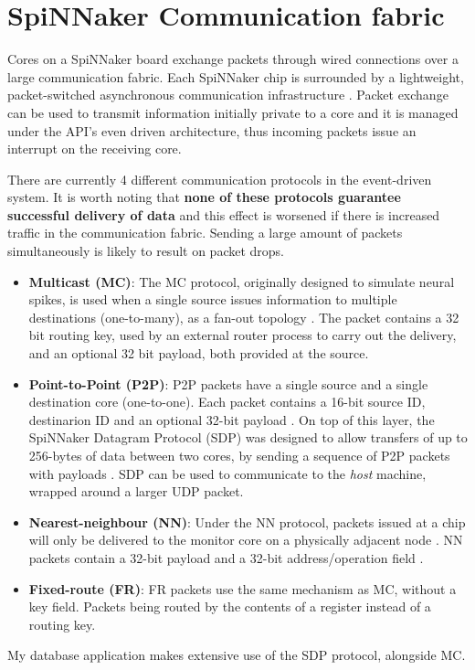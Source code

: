 \section{SpiNNaker Communication fabric}
\label{sec:comm_fabric}

Cores on a SpiNNaker board exchange packets through wired connections over a large communication fabric. Each SpiNNaker chip is surrounded by a lightweight, packet-switched asynchronous communication infrastructure \cite{spinnchip}. Packet exchange can be used to transmit information initially private to a core and it is managed under the API's even driven architecture, thus incoming packets issue an interrupt on the receiving core.

There are currently 4 different communication protocols in the event-driven system. It is worth noting that \textbf{none of these protocols guarantee successful delivery of data} and this effect is worsened if there is increased traffic in the communication fabric. Sending a large amount of packets simultaneously is likely to result on packet drops.

\begin{itemize}
\item \textbf{Multicast (MC)}: The MC protocol, originally designed to simulate neural spikes, is used when a single source issues information to multiple destinations (one-to-many), as a fan-out topology \cite{overviewspinn}. The packet contains a 32 bit routing key, used by an external router process to carry out the delivery, and an optional 32 bit payload, both provided at the source.

\item \textbf{Point-to-Point (P2P)}: P2P packets have a single source and a single destination core (one-to-one). Each packet contains a 16-bit source ID, destinarion ID and an optional 32-bit payload \cite{datasheet}.
On top of this layer, the SpiNNaker Datagram Protocol (SDP) was designed to allow transfers of up to 256-bytes of data between two cores, by sending a sequence of P2P packets with payloads \cite{sdp}. SDP can be used to communicate to the \textit{host} machine, wrapped around a larger UDP packet.

\item \textbf{Nearest-neighbour (NN)}: Under the NN protocol, packets issued at a chip will only be delivered to the monitor core on a physically adjacent node \cite{overviewspinn}. NN packets contain a 32-bit payload and a 32-bit address/operation field \cite{datasheet}.

\item \textbf{Fixed-route (FR)}: FR packets use the same mechanism as MC, without a key field. Packets being routed by the contents of a register instead of a routing key. 
\end{itemize}

My database application makes extensive use of the SDP protocol, alongside MC.